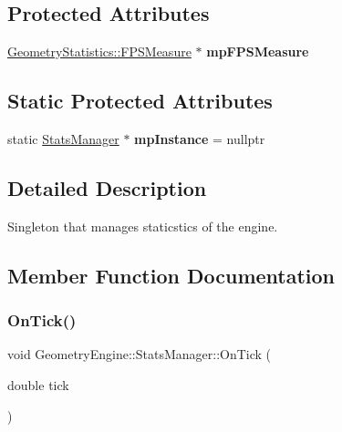 \subsection*{Protected Attributes}
\begin{DoxyCompactItemize}
\item 
\mbox{\label{class_geometry_engine_1_1_stats_manager_aee8d5fa0c0086e34da22581d51e6ad50}} 
\mbox{\hyperlink{class_geometry_engine_1_1_geometry_statistics_1_1_f_p_s_measure}{Geometry\+Statistics\+::\+F\+P\+S\+Measure}} $\ast$ {\bfseries mp\+F\+P\+S\+Measure}
\end{DoxyCompactItemize}
\subsection*{Static Protected Attributes}
\begin{DoxyCompactItemize}
\item 
\mbox{\label{class_geometry_engine_1_1_stats_manager_afe8def61bb479e7b17cba99f5fdd5b3f}} 
static \mbox{\hyperlink{class_geometry_engine_1_1_stats_manager}{Stats\+Manager}} $\ast$ {\bfseries mp\+Instance} = nullptr
\end{DoxyCompactItemize}


\subsection{Detailed Description}
Singleton that manages staticstics of the engine. 

\subsection{Member Function Documentation}
\mbox{\label{class_geometry_engine_1_1_stats_manager_a6a890829fb4b7d459b3a4d9e03864dd9}} 
\subsubsection{\texorpdfstring{OnTick()}{OnTick()}}
{\footnotesize\ttfamily void Geometry\+Engine\+::\+Stats\+Manager\+::\+On\+Tick (\begin{DoxyParamCaption}\item[{double}]{tick }\end{DoxyParamCaption})}

